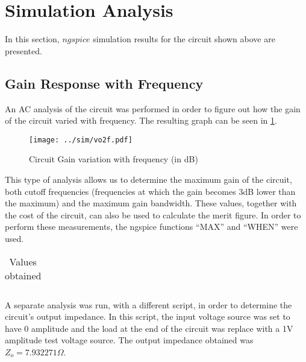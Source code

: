 \section{Simulation Analysis}
\label{sec:simulation}

In this section, $ngspice$ simulation results for the circuit shown above are presented.


\subsection{Gain Response with Frequency}

An AC analysis of the circuit was performed in order to figure out how the gain of the circuit varied with frequency. The resulting graph can be seen in \ref{fig:gain_freq}.

\begin{figure}[H] \centering
\texttt{[image: ../sim/vo2f.pdf]}
\caption{Circuit Gain variation with frequency (in dB)}
\label{fig:gain_freq}
\end{figure}

This type of analysis allows us to determine the maximum gain of the circuit, both cutoff frequencies (frequencies at which the gain becomes 3dB lower than the maximum) and the maximum gain bandwidth. These values, together with the cost of the circuit, can also be used to calculate the merit figure. In order to perform these measurements, the ngspice functions ``MAX'' and ``WHEN'' were used.

\begin{table}[H]
  \centering
  \begin{tabular}{|c|c|}
    \hline
      
  \end{tabular}
  \caption{Values obtained}
  \label{tab:resultssim}
\end{table}

A separate analysis was run, with a different script, in order to determine the circuit's output impedance. In this script, the input voltage source was set to have 0 amplitude and the load at the end of the circuit was replace with a 1V amplitude test voltage source. The output impedance obtained was $Z_o = 7.932271 \Omega$.





